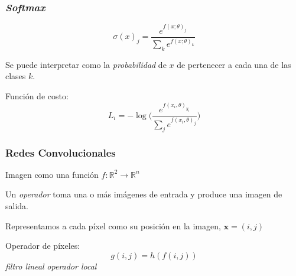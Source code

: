 \documentclass{beamer}
\begin{document}
\begin{frame}
\begin{figure}[H]
{
    }
\end{figure}
\end{frame}



\begin{frame}
\frametitle{\textit{Softmax}}
\vfill

\begin{equation}
    \sigma(x)_j =  \frac{e^{f(x;\theta)_{j}}} {\sum_{k} e^{f(x;\theta)_{k}}}
\end{equation}
\vfill

Se puede interpretar como la \textit{probabilidad} de \(x\) de pertenecer a cada una de las clases \(k\).
\vfill

Función de costo:
\begin{equation}
     L_i = - \log \bigg( \frac{e^{f(x_i, \theta)_{y_{i}}}} {\sum_j e^{f(x_i, \theta)_j}}\bigg)
\end{equation}
\vfill

\end{frame}




\begin{frame}
\frametitle{Redes Convolucionales}
Imagen como una función \(f:\mathbb{R}^2 \to \mathbb{R}^n\) 
\vfill

Un \textit{operador} toma una o más imágenes de entrada y produce una
imagen de salida.  
\vfill
	
Representamos a cada píxel como su posición en la imagen, \(\boldsymbol{x} = (i, j)\)
\vfill
	
Operador de píxeles:
\begin{equation}
g(i,j) = h(f(i,j))
\end{equation}
\vfill
\textit{filtro lineal} \textrightarrow \textit{operador local}
\end{frame}
\end{document}
